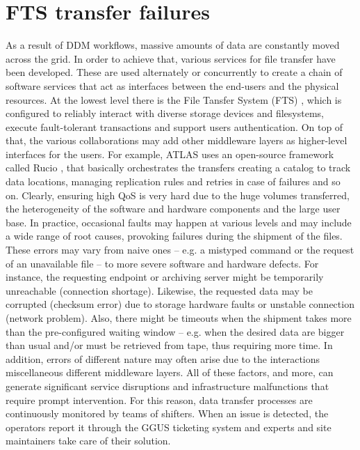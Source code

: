 \section{FTS transfer failures} \label{sec:pipeline}

As a result of DDM workflows, massive amounts of data are constantly moved across the grid.
In order to achieve that, various services for file transfer have been developed. These are used alternately or concurrently to create a chain of software services that act as interfaces between the end-users and the physical resources.
At the lowest level there is the File Tansfer System (FTS) \cite{karavakis2020fts}, which is configured to reliably interact with diverse storage devices and filesystems, execute fault-tolerant transactions and support users authentication.
On top of that, the various collaborations may add other middleware layers as higher-level interfaces for the users.
For example, ATLAS uses an open-source framework called Rucio \cite{barisits2019rucio}, that basically orchestrates the transfers creating a catalog to track data locations, managing replication rules and retries in case of failures and so on.
Clearly, ensuring high QoS is very hard due to the huge volumes transferred, the heterogeneity of the software and hardware components and the large user base.
In practice, occasional faults may happen at various levels and may include a wide range of root causes, provoking failures during the shipment of the files.
These errors may vary from naive ones -- e.g. a mistyped command or the request of an unavailable file -- to more severe software and hardware defects.
For instance, the requesting endpoint or archiving server might be temporarily unreachable (connection shortage).
Likewise, the requested data may be corrupted (checksum error) due to storage hardware faults or unstable connection (network problem).
Also, there might be timeouts when the shipment takes more than the pre-configured waiting window -- e.g. when the desired data are bigger than usual and/or must be retrieved from tape, thus requiring more time.
In addition, errors of different nature may often arise due to the interactions miscellaneous different middleware layers.
All of these factors, and more, can generate significant service disruptions and infrastructure malfunctions that require prompt intervention.
For this reason, data transfer processes are continuously monitored by teams of shifters. When an issue is detected, the operators report it through the GGUS ticketing system \cite{antoni2008ggus} and experts and site maintainers take care of their solution.
